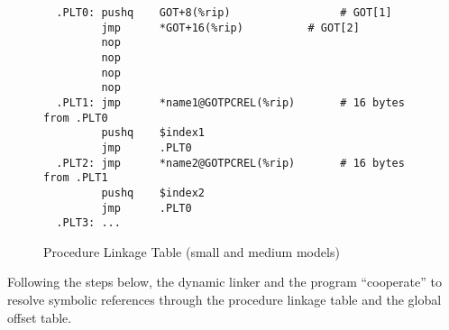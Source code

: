 \begin{figure}[H]
\Hrule
\caption{Procedure Linkage Table (small and medium models)}
\label{small_med_plt}
\begin{footnotesize}
\begin{verbatim}
  .PLT0: pushq    GOT+8(%rip)                 # GOT[1]
         jmp      *GOT+16(%rip)          # GOT[2]
         nop
         nop
         nop
         nop
  .PLT1: jmp      *name1@GOTPCREL(%rip)       # 16 bytes from .PLT0
         pushq    $index1
         jmp      .PLT0
  .PLT2: jmp      *name2@GOTPCREL(%rip)       # 16 bytes from .PLT1
         pushq    $index2
         jmp      .PLT0
  .PLT3: ...
\end{verbatim}%
\end{footnotesize}
\Hrule
\end{figure}

Following the steps below, the dynamic linker and the program
``cooperate'' to resolve symbolic references through the procedure
linkage table and the global offset table.

